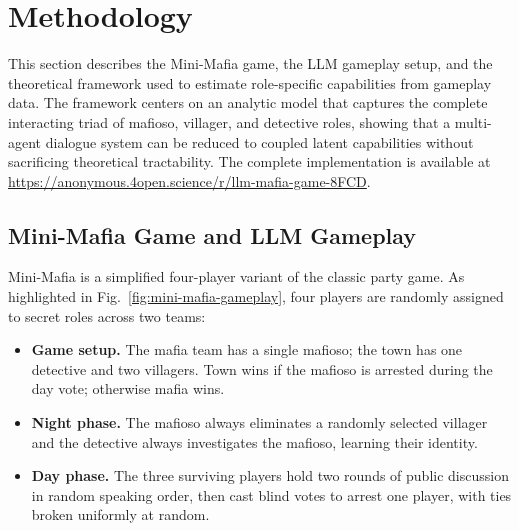 \documentclass[sigconf,anonymous,balance=false]{aamas}
\begin{document}
\section{Methodology}
\label{sec:methodology}

This section describes the Mini-Mafia game, the LLM gameplay setup, and the theoretical framework used to estimate role-specific capabilities from gameplay data. The framework centers on an analytic model that captures the complete interacting triad of mafioso, villager, and detective roles, showing that a multi-agent dialogue system can be reduced to coupled latent capabilities without sacrificing theoretical tractability. The complete implementation is available at \url{https://anonymous.4open.science/r/llm-mafia-game-8FCD}.


\subsection{Mini-Mafia Game and LLM Gameplay}
\label{sec:mini_mafia_gameplay}

Mini-Mafia is a simplified four-player variant of the classic party game. As highlighted in Fig.~\ref{fig:mini-mafia-gameplay}, four players are randomly assigned to secret roles across two teams:
\begin{itemize}
    \item \textbf{Game setup.} The mafia team has a single mafioso; the town has one detective and two villagers. Town wins if the mafioso is arrested during the day vote; otherwise mafia wins.

    \item \textbf{Night phase.} The mafioso always eliminates a randomly selected villager and the detective always investigates the mafioso, learning their identity.

    \item \textbf{Day phase.} The three surviving players hold two rounds of public discussion in random speaking order, then cast blind votes to arrest one player, with ties broken uniformly at random.
\end{itemize}
\end{document}
